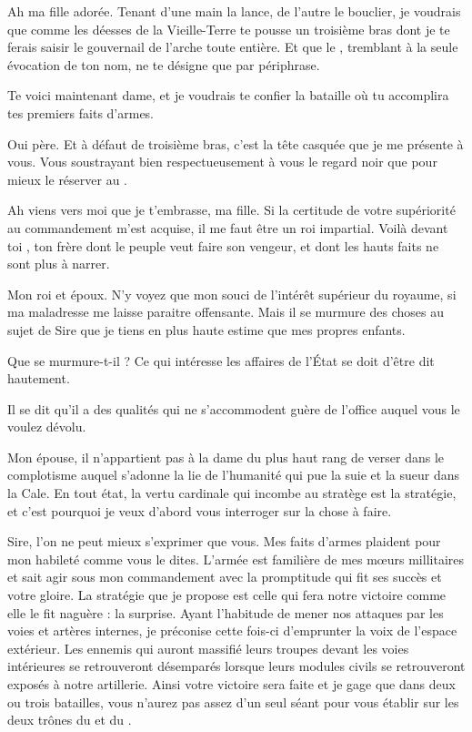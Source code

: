 \begin{drama}
  \roispeaks Ah ma fille adorée. Tenant d’une main la lance, de l’autre le bouclier, je voudrais que comme les déesses de la Vieille-Terre te pousse un troisième bras dont je te ferais saisir le gouvernail de l’arche toute entière. Et que le \campoppose{}, tremblant à la seule évocation de ton nom, ne te désigne que par périphrase.

  Te voici maintenant dame, et je voudrais te confier la bataille où tu accomplira tes premiers faits d’armes.


  \princessespeaks Oui père. Et à défaut de troisième bras, c’est la tête casquée que je me présente à vous. Vous soustrayant bien respectueusement à vous le regard noir que pour mieux le réserver au \campoppose{}.

  \roispeaks Ah viens vers moi que je t’embrasse, ma fille. Si la certitude de votre supériorité au commandement m’est acquise, il me faut être un roi impartial. Voilà devant toi \elena{}, ton frère dont le peuple veut faire son vengeur, et \general{} dont les hauts faits ne sont plus à narrer.

  \reinespeaks Mon roi et époux. N’y voyez que mon souci de l’intérêt supérieur du royaume, si ma maladresse me laisse paraitre offensante. Mais il se murmure des choses au sujet de Sire \elena{} que je tiens en plus haute estime que mes propres enfants.

  \roispeaks Que se murmure-t-il ?  Ce qui intéresse les affaires de l’État se doit d’être dit hautement.

  \reinespeaks Il se dit qu’il a des qualités qui ne s’accommodent guère de l’office auquel vous le voulez dévolu.

  \roispeaks Mon épouse, il n’appartient pas à la dame du plus haut rang de verser dans le complotisme auquel s’adonne la lie de l’humanité qui pue la suie et la sueur dans la Cale.
  En tout état, la vertu cardinale qui incombe au stratège est la stratégie,  et c’est pourquoi je veux d’abord vous interroger \general{} sur la chose à faire.

  \generalspeaks Sire, l’on ne peut mieux s’exprimer que vous. Mes faits d’armes plaident pour mon habileté comme vous le dites. L’armée est familière de mes mœurs millitaires et sait agir sous mon commandement avec la promptitude qui fit ses succès et votre gloire. La stratégie que je propose est celle qui fera notre victoire comme elle le fit naguère : la surprise. Ayant l’habitude de mener nos attaques par les voies et artères internes, je préconise cette fois-ci d’emprunter la voix de l’espace extérieur. Les ennemis qui auront massifié leurs troupes devant les voies intérieures se retrouveront désemparés lorsque leurs modules civils se retrouveront exposés à notre artillerie. Ainsi votre victoire sera faite et je gage que dans deux ou trois batailles, vous n’aurez pas assez d’un seul séant pour vous établir sur les deux trônes du \campprincipal{} et du \campoppose{}.


\end{drama}

